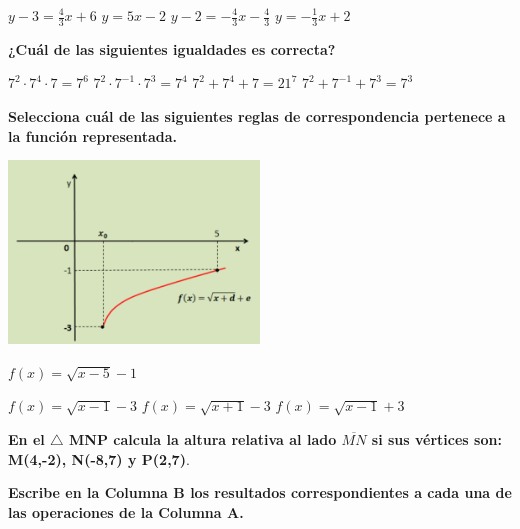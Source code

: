 \documentclass[11pt, addpoints, answers]{exam}
\begin{document}
\begin{questions}
\begin{center}
		\end{center}
		\begin{oneparchoices}
			\textbf{\choice} $y-3 = \frac{4}{3}x+6$
			\textbf{\choice} $y = 5x-2$
			\textbf{\choice} $y-2 = -\frac{4}{3}x - \frac{4}{3}$
			\textbf{\choice} $y = -\frac{1}{3}x+2$
		\end{oneparchoices}
		
			\vspace{1.2cm}
		
		
		\question[1] \textbf{¿Cuál de las siguientes igualdades es correcta?}
		\begin{checkboxes}
			\choice $7^2 \cdot 7^4 \cdot 7 = 7^6$
			\choice $7^2 \cdot 7^{-1} \cdot 7^3 = 7^4$
			\choice $7^2 + 7^4 + 7 = 21^7$
			\choice $7^2 + 7^{-1} + 7^3 = 7^3$
		\end{checkboxes}
		
		\question[1] \textbf{Selecciona cuál de las siguientes reglas de correspondencia pertenece a la función representada.}
		\begin{center}
			\includegraphics[width=0.5\textwidth]{image_249683.png}
		\end{center}
		\begin{checkboxes}
			\choice $f(x) = \sqrt{x-5}-1$
			
			\choice $f(x) = \sqrt{x-1}-3$
			\choice $f(x) = \sqrt{x+1}-3$
			\choice $f(x) = \sqrt{x-1}+3$
		\end{checkboxes}
\question[1]\textbf{En el $\triangle$ MNP calcula la altura relativa al lado $\overline{MN}$ si sus vértices son: M(4,-2), N(-8,7) y P(2,7)}.	%
		
		\question[1] \textbf{Escribe en la Columna B los resultados correspondientes a cada una de las operaciones de la Columna A.}
		

\end{questions}
\end{document}
